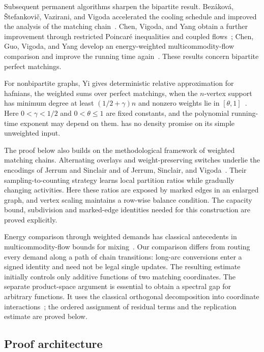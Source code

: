 \documentclass[11pt]{article}
\theoremstyle{definition}
\theoremstyle{remark}
\numberwithin{equation}{section}
\begin{document}
Subsequent permanent algorithms sharpen the bipartite result.
Bez\'{a}kov\'{a}, \v{S}tefankovi\v{c}, Vazirani, and Vigoda accelerated the
cooling schedule and improved the analysis of the matching
chain~\cite{BezakovaStefankovicVaziraniVigoda2008}.
Chen, Vigoda, and Yang obtain a further improvement through restricted
Poincar\'e inequalities and coupled flows~\cite{ChenVigodaYang2026};
Chen, Guo, Vigoda, and Yang develop an energy-weighted
multicommodity-flow comparison and improve the running time
again~\cite{ChenGuoVigodaYang2026}. These results concern bipartite
perfect matchings.

For nonbipartite graphs, Yi gives deterministic relative approximation
for hafnians, the weighted sums over perfect matchings, when the
$n$-vertex support has minimum degree at least $(1/2+\gamma)n$ and
nonzero weights lie in $[\theta,1]$~\cite[Theorem~1.1]{Yi2026}.
Here $0<\gamma<1/2$ and $0<\theta\le1$ are fixed constants, and the
polynomial running-time exponent may depend on them.
 has no density promise on its simple unweighted input.

The proof below also builds on the methodological framework of weighted
matching chains. Alternating overlays and weight-preserving switches
underlie the encodings of Jerrum and Sinclair and of Jerrum, Sinclair,
and Vigoda~\cite{JerrumSinclair1989,JerrumSinclairVigoda2004}.
Their sampling-to-counting strategy learns local partition ratios while
gradually changing activities.
Here these ratios are exposed by marked edges in an enlarged graph,
and vertex scaling maintains a row-wise balance condition. The
capacity bound, subdivision and marked-edge identities needed for this
construction are proved explicitly.

Energy comparison through weighted demands has classical antecedents
in multicommodity-flow bounds for mixing~\cite{Sinclair1992}.
Our comparison differs from routing every demand along a path of chain
transitions: long-arc conversions enter a signed identity and need not
be legal single updates. The resulting estimate initially controls
only additive functions of two matching coordinates. The separate
product-space argument is essential to obtain a spectral gap for
arbitrary functions. It uses the classical orthogonal decomposition
into coordinate interactions~\cite[Section~2]{EfronStein1981}; the
ordered assignment of residual terms and the replication estimate are
proved below.

\subsection{Proof architecture}
\end{document}
